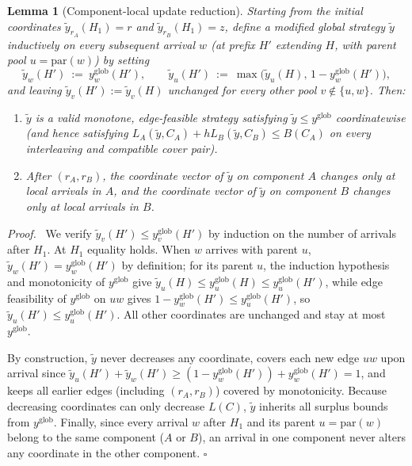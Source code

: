 \documentclass[11pt,letterpaper]{article}
\newtheorem{lemma}{Lemma}[section]
\newenvironment{proof}[1][Proof]{\par\smallskip\noindent\textit{#1.}\ \ignorespaces}{\hfill$\square$\par\medskip}
\begin{document}
\begin{lemma}[Component-local update reduction]\label{lem:lazy}
Starting from the initial coordinates $\tilde y_{r_A}(H_1)=r$ and $\tilde y_{r_B}(H_1)=z$, define a modified global strategy $\tilde y$ inductively on every subsequent arrival $w$ (at prefix $H'$ extending $H$, with parent pool $u=\mathrm{par}(w)$) by setting
\[
  \tilde y_w(H')\ :=\ y^{\text{glob}}_w(H'),\qquad
  \tilde y_u(H')\ :=\ \max\bigl(\tilde y_u(H),\,1-y^{\text{glob}}_w(H')\bigr),
\]
and leaving $\tilde y_v(H') := \tilde y_v(H)$ unchanged for every other pool $v\notin\{u,w\}$. Then:
\begin{enumerate}
\item $\tilde y$ is a valid monotone, edge-feasible strategy satisfying $\tilde y\le y^{\text{glob}}$ coordinatewise (and hence satisfying $L_A(\tilde y,C_A)+hL_B(\tilde y,C_B)\le B(C_A)$ on every interleaving and compatible cover pair).
\item After $(r_A,r_B)$, the coordinate vector of $\tilde y$ on component $A$ changes \emph{only} at local arrivals in $A$, and the coordinate vector of $\tilde y$ on component $B$ changes \emph{only} at local arrivals in $B$.
\end{enumerate}
\end{lemma}

\begin{proof}
We verify $\tilde y_v(H')\le y^{\text{glob}}_v(H')$ by induction on the number of arrivals after $H_1$. At $H_1$ equality holds. When $w$ arrives with parent $u$, $\tilde y_w(H')=y^{\text{glob}}_w(H')$ by definition; for its parent $u$, the induction hypothesis and monotonicity of $y^{\text{glob}}$ give $\tilde y_u(H)\le y^{\text{glob}}_u(H)\le y^{\text{glob}}_u(H')$, while edge feasibility of $y^{\text{glob}}$ on $uw$ gives $1-y^{\text{glob}}_w(H')\le y^{\text{glob}}_u(H')$, so $\tilde y_u(H')\le y^{\text{glob}}_u(H')$. All other coordinates are unchanged and stay at most $y^{\text{glob}}$.

By construction, $\tilde y$ never decreases any coordinate, covers each new edge $uw$ upon arrival since $\tilde y_u(H')+\tilde y_w(H')\ge (1-y^{\text{glob}}_w(H'))+y^{\text{glob}}_w(H')=1$, and keeps all earlier edges (including $(r_A,r_B)$) covered by monotonicity. Because decreasing coordinates can only decrease $L(C)$, $\tilde y$ inherits all surplus bounds from $y^{\text{glob}}$. Finally, since every arrival $w$ after $H_1$ and its parent $u=\mathrm{par}(w)$ belong to the same component ($A$ or $B$), an arrival in one component never alters any coordinate in the other component.
\end{proof}
\end{document}
